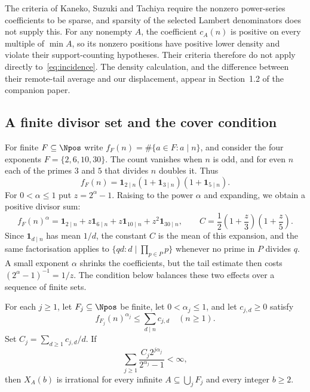 \documentclass[11pt]{article}
\begin{document}
The criteria of Kaneko, Suzuki and Tachiya
\cite[Theorems~1 and~3]{kanekosuzukitachiya} require the nonzero
power-series coefficients to be sparse, and sparsity of the selected
Lambert denominators does not supply this. For any nonempty $A$, the
coefficient $c_A(n)$ is positive on every multiple of $\min A$, so its
nonzero positions have positive lower density and violate their
support-counting hypotheses. Their criteria therefore do not apply
directly to~\eqref{eq:incidence}. The density calculation, and the
difference between their remote-tail average and our displacement,
appear in
{Section~1.2 of the companion paper}.


\subsection{A finite divisor set and the cover condition}
For finite $F\subseteq\Npos$ write $f_F(n)=\#\{a\in F:a\mid n\}$, and
consider the four exponents $F=\{2,6,10,30\}$. The count vanishes when
$n$ is odd, and for even $n$ each of the primes $3$ and $5$ that
divides $n$ doubles it. Thus
\[
 f_F(n)=\mathbf1_{2\mid n}(1+\mathbf1_{3\mid n})(1+\mathbf1_{5\mid n}).
\]
For $0<\alpha\le1$ put $z=2^\alpha-1$. Raising to the power $\alpha$
and expanding, we obtain a positive divisor sum:
\[
 f_F(n)^\alpha
 =\mathbf1_{2\mid n}+z\mathbf1_{6\mid n}
  +z\mathbf1_{10\mid n}+z^2\mathbf1_{30\mid n},\qquad
 C=\frac12\left(1+\frac z3\right)\left(1+\frac z5\right).
\]
Since $\mathbf1_{d\mid n}$ has mean $1/d$, the constant $C$ is the mean
of this expansion, and the same factorisation applies to
$\{qd:d\mid\prod_{p\in P}p\}$ whenever no prime in $P$ divides $q$.
A small exponent $\alpha$ shrinks the coefficients, but the tail
estimate then costs $(2^\alpha-1)^{-1}=1/z$. The condition below
balances these two effects over a sequence of finite sets.

\begin{theorem}\label{thm:variable-fractional-cover}
For each $j\ge1$, let $F_j\subseteq\Npos$ be finite, let
$0<\alpha_j\le1$, and let $c_{j,d}\ge0$ satisfy
\[
 f_{F_j}(n)^{\alpha_j}\le\sum_{d\mid n}c_{j,d}\quad(n\ge1).
\]
Set $C_j=\sum_{d\ge1}c_{j,d}/d$.  If
\begin{equation*}
 \sum_{j\ge1}\frac{C_j2^{j\alpha_j}}{2^{\alpha_j}-1}<\infty,
 \tag{V}\label{eq:strengthened-cover}
\end{equation*}
then $X_A(b)$ is irrational for every infinite
$A\subseteq\bigcup_jF_j$ and every integer $b\ge2$.
\end{theorem}
\end{document}
